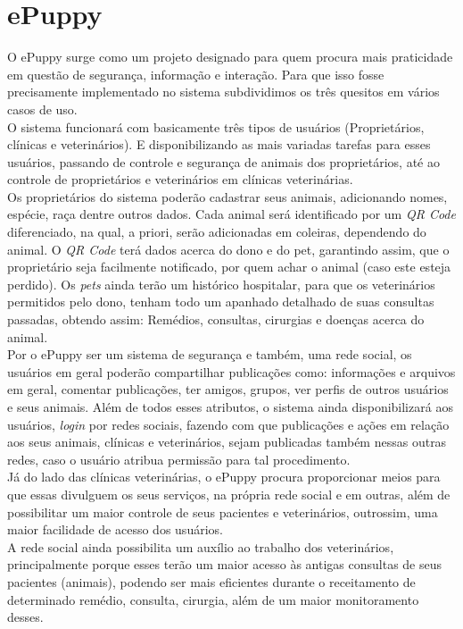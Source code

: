 \section{ePuppy}
O ePuppy surge como um projeto designado para quem procura mais praticidade em questão de segurança, informação e interação. Para que isso fosse precisamente implementado no sistema subdividimos os três quesitos em vários casos de uso.
\\
\indent
O sistema funcionará com basicamente três tipos de usuários (Proprietários, clínicas e veterinários). E disponibilizando as mais variadas tarefas para esses usuários, passando de controle e segurança de animais dos proprietários, até ao controle de proprietários e veterinários em clínicas veterinárias.
\\
\indent
Os proprietários do sistema poderão cadastrar seus animais, adicionando nomes, espécie, raça dentre outros dados. Cada animal será identificado por um {\it QR Code} diferenciado, na qual, a priori, serão adicionadas em coleiras, dependendo do animal. O {\it QR Code} terá dados acerca do dono e do pet, garantindo assim, que o proprietário seja facilmente notificado, por quem achar o animal (caso este esteja perdido). Os {\it pets} ainda terão um histórico hospitalar, para que os veterinários permitidos pelo dono, tenham todo um apanhado detalhado de suas consultas passadas, obtendo assim: Remédios, consultas, cirurgias e doenças acerca do animal.
\\
\indent
Por o ePuppy ser um sistema de segurança e também, uma rede social, os usuários em geral poderão compartilhar publicações como: informações e arquivos em geral, comentar publicações, ter amigos, grupos, ver perfis de outros usuários e seus animais. Além de todos esses atributos, o sistema ainda disponibilizará aos usuários, {\it login} por redes sociais, fazendo com que publicações e ações em relação aos seus animais, clínicas e veterinários, sejam publicadas também nessas outras redes, caso o usuário atribua permissão para tal procedimento.
\\
\indent
Já do lado das clínicas veterinárias, o ePuppy procura proporcionar meios para que essas divulguem os seus serviços, na própria rede social e em outras, além de possibilitar um maior controle de seus pacientes e veterinários, outrossim, uma maior facilidade de acesso dos usuários.
\\
\indent
A rede social ainda possibilita um auxílio ao trabalho dos veterinários, principalmente porque esses terão um maior acesso às antigas consultas de seus pacientes (animais), podendo ser mais eficientes durante o receitamento de determinado remédio, consulta, cirurgia, além de um maior monitoramento desses.

